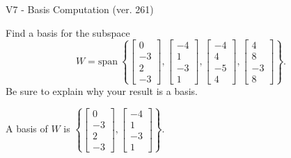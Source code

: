 \begin{exercise}
  \begin{exerciseTitle}V7 - Basis Computation (ver. 261)\end{exerciseTitle}
  \begin{exerciseStatement}
    Find a basis for the subspace 
\[W=\mathrm{span}\ \left\{\left[\begin{array}{r}
0 \\
-3 \\
2 \\
-3
\end{array}\right] , \left[\begin{array}{r}
-4 \\
1 \\
-3 \\
1
\end{array}\right] , \left[\begin{array}{r}
-4 \\
4 \\
-5 \\
4
\end{array}\right] , \left[\begin{array}{r}
4 \\
8 \\
-3 \\
8
\end{array}\right]\right\}.\]
 Be sure to explain why your result is a basis.


  \end{exerciseStatement}
  \begin{exerciseAnswer}
   A basis of \(W\) is  \(\left\{\left[\begin{array}{r}
0 \\
-3 \\
2 \\
-3
\end{array}\right] , \left[\begin{array}{r}
-4 \\
1 \\
-3 \\
1
\end{array}\right]\right\}\).
  


  \end{exerciseAnswer}
\end{exercise}